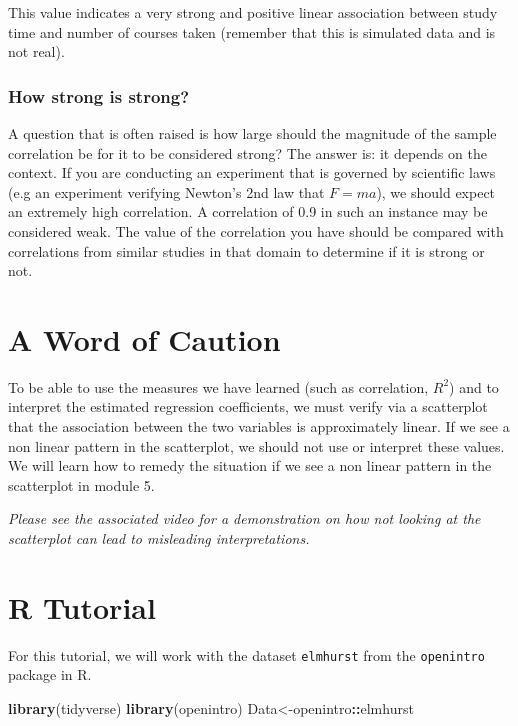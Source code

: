 \documentclass[
]{book}
\newenvironment{Shaded}{\begin{snugshade}}{\end{snugshade}}
\newcommand{\FunctionTok}[1]{\textcolor[rgb]{0.13,0.29,0.53}{\textbf{#1}}}
\newcommand{\NormalTok}[1]{#1}
\newcommand{\OtherTok}[1]{\textcolor[rgb]{0.56,0.35,0.01}{#1}}
\newcommand{\SpecialCharTok}[1]{\textcolor[rgb]{0.81,0.36,0.00}{\textbf{#1}}}
\begin{document}
This value indicates a very strong and positive linear association between study time and number of courses taken (remember that this is simulated data and is not real).

\hypertarget{how-strong-is-strong}{%
\subsubsection{How strong is strong?}\label{how-strong-is-strong}}

A question that is often raised is how large should the magnitude of the sample correlation be for it to be considered strong? The answer is: it depends on the context. If you are conducting an experiment that is governed by scientific laws (e.g an experiment verifying Newton's 2nd law that \(F = ma\)), we should expect an extremely high correlation. A correlation of 0.9 in such an instance may be considered weak. The value of the correlation you have should be compared with correlations from similar studies in that domain to determine if it is strong or not.

\hypertarget{a-word-of-caution}{%
\section{A Word of Caution}\label{a-word-of-caution}}

To be able to use the measures we have learned (such as correlation, \(R^2\)) and to interpret the estimated regression coefficients, we must verify via a scatterplot that the association between the two variables is approximately linear. If we see a non linear pattern in the scatterplot, we should not use or interpret these values. We will learn how to remedy the situation if we see a non linear pattern in the scatterplot in module 5.

\emph{Please see the associated video for a demonstration on how not looking at the scatterplot can lead to misleading interpretations.}

\hypertarget{r-tutorial}{%
\section{R Tutorial}\label{r-tutorial}}

For this tutorial, we will work with the dataset \texttt{elmhurst} from the \texttt{openintro} package in R.

\begin{Shaded}
\begin{Highlighting}[]
\FunctionTok{library}\NormalTok{(tidyverse)}
\FunctionTok{library}\NormalTok{(openintro)}
\NormalTok{Data}\OtherTok{\textless{}{-}}\NormalTok{openintro}\SpecialCharTok{::}\NormalTok{elmhurst}
\end{Highlighting}
\end{Shaded}
\end{document}
